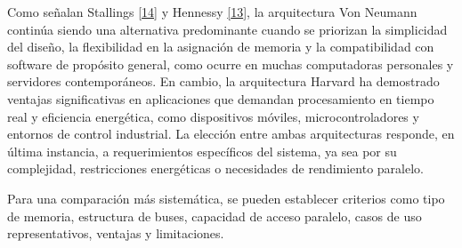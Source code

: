 \documentclass[12pt,oneside]{templates/unerthesis}
\begin{document}
Como señalan Stallings \protect\hyperlink{ref-stallings_computer_2021}{{[}14{]}} y Hennessy \protect\hyperlink{ref-hennessy2017computer}{{[}13{]}}, la arquitectura Von Neumann continúa siendo una alternativa predominante cuando se priorizan la simplicidad del diseño, la flexibilidad en la asignación de memoria y la compatibilidad con software de propósito general, como ocurre en muchas computadoras personales y servidores contemporáneos. En cambio, la arquitectura Harvard ha demostrado ventajas significativas en aplicaciones que demandan procesamiento en tiempo real y eficiencia energética, como dispositivos móviles, microcontroladores y entornos de control industrial. La elección entre ambas arquitecturas responde, en última instancia, a requerimientos específicos del sistema, ya sea por su complejidad, restricciones energéticas o necesidades de rendimiento paralelo.

Para una comparación más sistemática, se pueden establecer criterios como tipo de memoria, estructura de buses, capacidad de acceso paralelo, casos de uso representativos, ventajas y limitaciones.

\begin{table}[!h]
\centering
\caption{\label{tab:unnamed-chunk-1}Cuadro comparativo entre arquitecturas Von Neumann y Harvard}
\centering
{}
\end{table}
\end{document}
